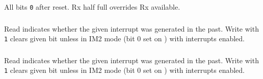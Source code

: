 All bits {\tt 0} after reset. Rx half full overrides Rx available.


\subsubsection{}

\begin{NextPort}
\end{NextPort}

Read indicates whether the given interrupt was generated in the past. Write with {\tt 1} clears given bit unless in IM2 mode (bit 0 set on ) with interrupts enabled.


\subsubsection{}

\begin{NextPort}
\end{NextPort}

Read indicates whether the given interrupt was generated in the past. Write with {\tt 1} clears given bit unless in IM2 mode (bit 0 set on ) with interrupts enabled.


\subsubsection{}

\begin{NextPort}
\end{NextPort}


